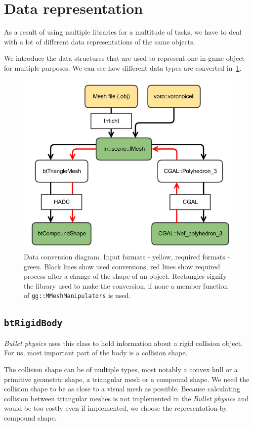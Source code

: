 \section{Data representation}
As a result of using multiple libraries for a multitude of tasks, we have to deal with a lot of different data representations of the same objects. 

We introduce the data structures that are used to represent one in-game object for multiple purposes. We can see how different data types are converted in~\cref{fig:conversions}.

\begin{figure}
        \centering
        \includegraphics[width=\textwidth]{img/conversions}
        \caption{Data conversion diagram. Input formats - yellow, required formats - green. Black lines show used conversions, red lines show required process after a change of the shape of an object. Rectangles signify the library used to make the conversion, if none a member function of {\tt gg::MMeshManipulators} is used.}
        \label{fig:conversions}
\end{figure}

\subsection*{\tt btRigidBody}
\emph{Bullet physics} uses this class to hold information about a rigid collision object. For us, most important part of the body is a collision shape.

The collision shape can be of multiple types, most notably a convex hull or a primitive geometric shape, a triangular mesh or a compound shape. We need the collision shape to be as close to a visual mesh as possible. Because calculating collision between triangular meshes is not implemented in the \emph{Bullet physics} and would be too costly even if implemented, we choose the representation by compound shape.

